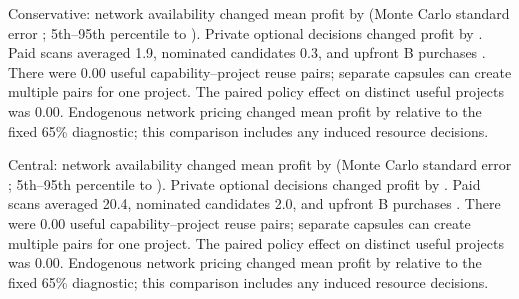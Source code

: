 Conservative: network availability changed mean profit by  (Monte Carlo standard error ; 5th--95th percentile  to ). Private optional decisions changed profit by . Paid scans averaged 1.9, nominated candidates 0.3, and upfront B purchases . There were 0.00 useful capability--project reuse pairs; separate capsules can create multiple pairs for one project. The paired policy effect on distinct useful projects was 0.00. Endogenous network pricing changed mean profit by  relative to the fixed 65\% diagnostic; this comparison includes any induced resource decisions.

Central: network availability changed mean profit by  (Monte Carlo standard error ; 5th--95th percentile  to ). Private optional decisions changed profit by . Paid scans averaged 20.4, nominated candidates 2.0, and upfront B purchases . There were 0.00 useful capability--project reuse pairs; separate capsules can create multiple pairs for one project. The paired policy effect on distinct useful projects was 0.00. Endogenous network pricing changed mean profit by  relative to the fixed 65\% diagnostic; this comparison includes any induced resource decisions.

